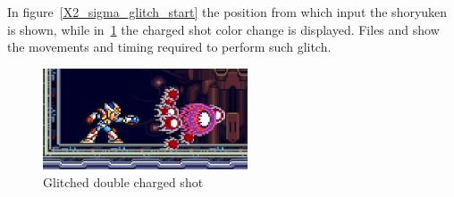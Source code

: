 In figure~\ref{X2_sigma_glitch_start} the position from which input the shoryuken is shown, while in~\ref{X2_glitch_shot} the charged shot color change is displayed. Files  and  show the movements and timing required to perform such glitch.


\begin{figure}[htp]
	\centering
	\includegraphics[height=3cm]{figures/X2/Miscs/glithced_double_shot.png}
	\caption{Glitched double charged shot}
	\label{X2_glitch_shot}
\end{figure}

